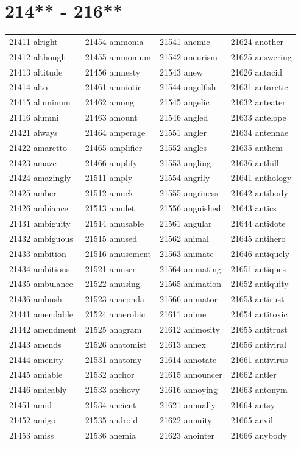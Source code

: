 \documentclass[10pt, oneside]{book}
\begin{document}
\begin{table}
	\centering
	\section*{214** - 216**}
	\begin{tabular}{l l l l}
21411 alright &21454 ammonia &21541 anemic &21624 another\\
21412 although &21455 ammonium &21542 aneurism &21625 answering\\
21413 altitude &21456 amnesty &21543 anew &21626 antacid\\
21414 alto &21461 amniotic &21544 angelfish &21631 antarctic\\
21415 aluminum &21462 among &21545 angelic &21632 anteater\\
21416 alumni &21463 amount &21546 angled &21633 antelope\\
21421 always &21464 amperage &21551 angler &21634 antennae\\
21422 amaretto &21465 amplifier &21552 angles &21635 anthem\\
21423 amaze &21466 amplify &21553 angling &21636 anthill\\
21424 amazingly &21511 amply &21554 angrily &21641 anthology\\
21425 amber &21512 amuck &21555 angriness &21642 antibody\\
21426 ambiance &21513 amulet &21556 anguished &21643 antics\\
21431 ambiguity &21514 amusable &21561 angular &21644 antidote\\
21432 ambiguous &21515 amused &21562 animal &21645 antihero\\
21433 ambition &21516 amusement &21563 animate &21646 antiquely\\
21434 ambitious &21521 amuser &21564 animating &21651 antiques\\
21435 ambulance &21522 amusing &21565 animation &21652 antiquity\\
21436 ambush &21523 anaconda &21566 animator &21653 antirust\\
21441 amendable &21524 anaerobic &21611 anime &21654 antitoxic\\
21442 amendment &21525 anagram &21612 animosity &21655 antitrust\\
21443 amends &21526 anatomist &21613 annex &21656 antiviral\\
21444 amenity &21531 anatomy &21614 annotate &21661 antivirus\\
21445 amiable &21532 anchor &21615 announcer &21662 antler\\
21446 amicably &21533 anchovy &21616 annoying &21663 antonym\\
21451 amid &21534 ancient &21621 annually &21664 antsy\\
21452 amigo &21535 android &21622 annuity &21665 anvil\\
21453 amiss &21536 anemia &21623 anointer &21666 anybody\\
	\end{tabular}
 \end{table}
\clearpage
\end{document}
